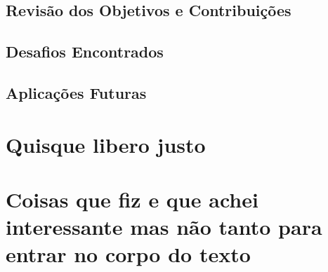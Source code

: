 \documentclass[12pt, %
openright, 
oneside, %
a4paper,    %
brazil]{facom-ufu-abntex2}
\begin{document}
\section{Revisão dos Objetivos e Contribuições}
\section{Desafios Encontrados}
\section{Aplicações Futuras}





\postextual






\begin{apendicesenv}

\partapendices

\chapter{Quisque libero justo}

\lipsum[50]

\chapter{Coisas que fiz e que achei interessante mas não tanto para entrar no corpo do texto}
\lipsum[55-57]

\end{apendicesenv}


\end{document}
